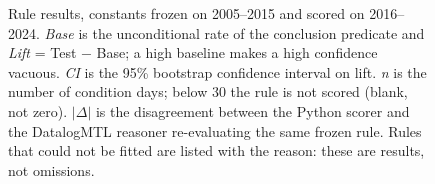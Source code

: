 \begin{figure}
\begin{tabular}{lllrrrrrrl}
\end{tabular}
\caption{Rule results, constants frozen on 2005--2015 and scored on 2016--2024. \emph{Base} is the unconditional rate of the conclusion predicate and \emph{Lift} = Test $-$ Base; a high baseline makes a high confidence vacuous. \emph{CI} is the 95\% bootstrap confidence interval on lift. \emph{n} is the number of condition days; below 30 the rule is not scored (blank, not zero). $|\Delta|$ is the disagreement between the Python scorer and the DatalogMTL reasoner re-evaluating the same frozen rule. Rules that could not be fitted are listed with the reason: these are results, not omissions.}
\label{tab:rule-results_classifier}
\end{figure}
